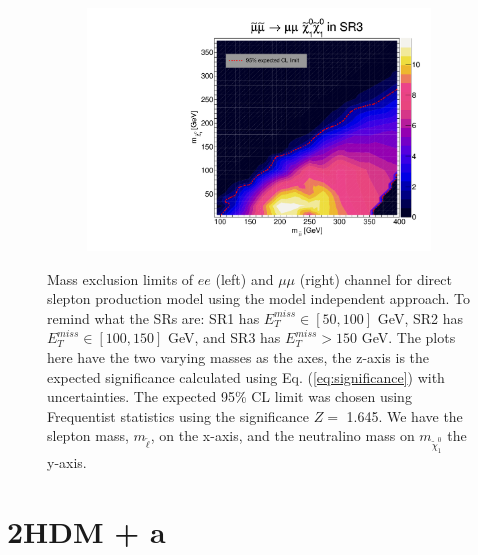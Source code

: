 \documentclass[12pt, a4paper]{book}
\begin{document}
\begin{figure}[!ht]
\begin{subfigure}[b]{0.49\textwidth}
   \end{subfigure}
   \hfill
   \begin{subfigure}[b]{0.49\textwidth}
      \centering
      \includegraphics[width=1\textwidth]{Limits/Model_independent/150/SlepSlep/SlepSlep_uu.pdf}
   \end{subfigure}
   \caption[Expected mass exclusion limits results for direct slepton production model on $ee$ and $\mu\mu$ channel using the model independent approach]{Mass exclusion limits of $ee$ (left) and $\mu\mu$ (right) channel for direct slepton production model using the model independent approach. To remind what the SRs are: SR1 has $E_T^{miss}\in[50, 100]$ GeV, SR2 has $E_T^{miss}\in[100, 150]$ GeV, and SR3 has $E_T^{miss}>150$ GeV. 
   The plots here have the two varying masses as the axes, the z-axis is the expected significance calculated using Eq. (\ref{eq:significance}) with uncertainties. The expected 95\% CL limit was chosen using Frequentist statistics using the significance $Z=$ 1.645.   
   We have the slepton mass, $m_{\tilde{\ell}}$, on the x-axis, and the neutralino mass on $m_{\tilde{\chi}_1^0}$ the y-axis.}
\end{figure}


\clearpage
\section{2HDM + a}
\end{document}
